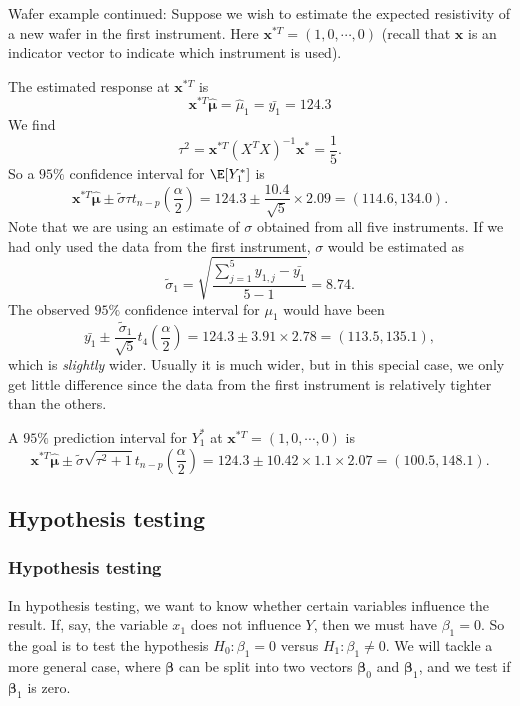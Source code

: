 \documentclass[a4paper]{article}
\begin{document}
\begin{eg}
  Wafer example continued: Suppose we wish to estimate the expected resistivity of a new wafer in the first instrument. Here $\mathbf{x}^{*T} = (1, 0, \cdots, 0)$ (recall that $\mathbf{x}$ is an indicator vector to indicate which instrument is used).

  The estimated response at $\mathbf{x}^{*T}$ is
  \[
    \mathbf{x}^{*T}\hat{\boldsymbol\mu} = \hat{\mu}_1 = \bar{y_1} = 124.3
  \]
  We find
  \[
    \tau^2 = \mathbf{x}^{*T}(X^TX)^{-1}\mathbf{x}^* = \frac{1}{5}.
  \]
  So a $95\%$ confidence interval for $\E[Y_1^*]$ is
  \[
    \mathbf{x}^{*T}\hat{\boldsymbol\mu}\pm \tilde{\sigma}\tau t_{n - p}\left(\frac{\alpha}{2}\right) = 124.3 \pm \frac{10.4}{\sqrt{5}}\times 2.09 = (114.6, 134.0).
  \]
  Note that we are using an estimate of $\sigma$ obtained from all five instruments. If we had only used the data from the first instrument, $\sigma$ would be estimated as
  \[
    \tilde{\sigma}_1 = \sqrt{ \frac{\sum_{j = 1}^5y_{1,j} - \bar{y_1}}{5 - 1}} = 8.74.
  \]
  The observed $95\%$ confidence interval for $\mu_1$ would have been
  \[
    \bar {y_1} \pm \frac{\tilde{\sigma}_1}{\sqrt{5}}t_4\left(\frac{\alpha}{2}\right) = 124.3\pm 3.91\times 2.78 = (113.5, 135.1),
  \]
  which is \emph{slightly} wider. Usually it is much wider, but in this special case, we only get little difference since the data from the first instrument is relatively tighter than the others.

  A $95\%$ prediction interval for $Y_1^*$ at $\mathbf{x}^{*T} = (1, 0, \cdots, 0)$ is
  \[
    \mathbf{x}^{*T} \hat{\boldsymbol\mu} \pm \tilde{\sigma}\sqrt{\tau^2 + 1} t_{n - p}\left(\frac{\alpha}{2}\right) = 124.3 \pm 10.42 \times 1.1\times 2.07 = (100.5, 148.1).
  \]
\end{eg}
\subsection{Hypothesis testing}
\subsubsection{Hypothesis testing}
In hypothesis testing, we want to know whether certain variables influence the result. If, say, the variable $x_1$ does not influence $Y$, then we must have $\beta_1 = 0$. So the goal is to test the hypothesis $H_0: \beta_1 = 0$ versus $H_1: \beta_1 \not= 0$. We will tackle a more general case, where $\boldsymbol\beta$ can be split into two vectors $\boldsymbol\beta_0$ and $\boldsymbol\beta_1$, and we test if $\boldsymbol\beta_1$ is zero.
\end{document}
